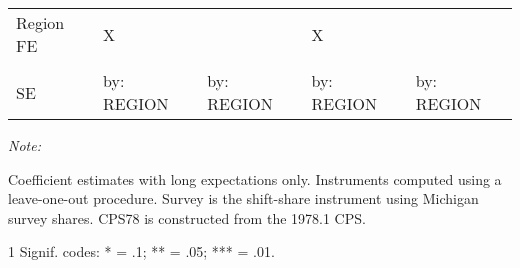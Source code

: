 \begin{table}[!htbp]
\begin{threeparttable}
\begin{tabular}{lllll}
\addlinespace
Region FE & X &  & X & \\
\cellcolor{gray!10}{Time FE} & \cellcolor{gray!10}{X} & \cellcolor{gray!10}{} & \cellcolor{gray!10}{} & \cellcolor{gray!10}{X}\\
SE & by: REGION & by: REGION & by: REGION & by: REGION\\
\bottomrule
\end{tabular}
\begin{tablenotes}
\item \textit{Note: } 
\item Coefficient estimates with long expectations only. Instruments computed using a leave-one-out procedure. Survey is the shift-share instrument using Michigan survey shares. CPS78 is constructed from the 1978.1 CPS.
\item[1] Signif. codes: * = .1; ** = .05; *** = .01.
\end{tablenotes}
\end{threeparttable}\end{table}

